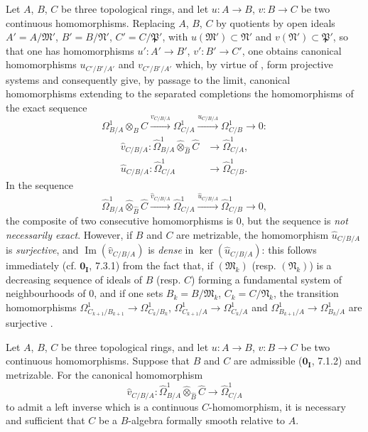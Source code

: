 \begin{env}[20.7.17]
\label{0.20.7.17}
Let $A$, $B$, $C$ be three topological rings, and let $u:A\to B$, $v:B\to C$ be two continuous homomorphisms. Replacing $A$, $B$, $C$ by quotients by open ideals $A'=A/\mathfrak{M}'$, $B'=B/\mathfrak{N}'$, $C'=C/\mathfrak{P}'$, with $u(\mathfrak{M}')\subset\mathfrak{N}'$ and $v(\mathfrak{N}')\subset\mathfrak{P}'$, so that one has homomorphisms $u':A'\to B'$, $v':B'\to C'$, one obtains canonical homomorphisms $u_{C'/B'/A'}$ and $v_{C'/B'/A'}$ which, by virtue of , form projective systems and consequently give, by passage to the limit, canonical homomorphisms extending to the separated completions the homomorphisms of the exact sequence 
\[
  \Omega^1_{B/A}\otimes_B C\xrightarrow{v_{C/B/A}}\Omega^1_{C/A}\xrightarrow{u_{C/B/A}}\Omega^1_{C/B}\longrightarrow 0:
\]
\begin{align}
  \widehat{v}_{C/B/A}:\widehat{\Omega}^1_{B/A}\widehat{\otimes}_{\widehat{B}}\widehat{C}&\longrightarrow\widehat{\Omega}^1_{C/A}, \tag{20.7.17.1}\label{0.20.7.17.1}\\
  \widehat{u}_{C/B/A}:\widehat{\Omega}^1_{C/A}&\longrightarrow\widehat{\Omega}^1_{C/B}. \tag{20.7.17.2}\label{0.20.7.17.2}
\end{align}
In the sequence
\begin{equation}
\tag{20.7.17.3}
\label{0.20.7.17.3}
  \widehat{\Omega}^1_{B/A}\widehat{\otimes}_{\widehat{B}}\widehat{C}
  \xrightarrow{\widehat{v}_{C/B/A}}\widehat{\Omega}^1_{C/A}
  \xrightarrow{\widehat{u}_{C/B/A}}\widehat{\Omega}^1_{C/B}\longrightarrow 0,
\end{equation}
the composite of two consecutive homomorphisms is $0$, but the sequence is \emph{not necessarily exact}. However, if $B$ and $C$ are metrizable, the homomorphism $\widehat{u}_{C/B/A}$ is \emph{surjective}, and $\operatorname{Im}(\widehat{v}_{C/B/A})$ is \emph{dense} in $\ker(\widehat{u}_{C/B/A})$: this follows immediately (cf. $\mathbf{0_I}$, 7.3.1) from the fact that, if $(\mathfrak{M}_k)$ (resp. $(\mathfrak{N}_k)$) is a decreasing sequence of ideals of $B$ (resp. $C$) forming a fundamental system of neighbourhoods of $0$, and if one sets $B_k=B/\mathfrak{M}_k$, $C_k=C/\mathfrak{N}_k$, the transition homomorphisms $\Omega^1_{C_{k+1}/B_{k+1}}\to\Omega^1_{C_k/B_k}$, $\Omega^1_{C_{k+1}/A}\to\Omega^1_{C_k/A}$ and $\Omega^1_{B_{k+1}/A}\to\Omega^1_{B_k/A}$ are surjective .
\end{env}

\begin{proposition}[20.7.18]
\label{0.20.7.18}
Let $A$, $B$, $C$ be three topological rings, and let $u:A\to B$, $v:B\to C$ be two continuous homomorphisms. Suppose that $B$ and $C$ are admissible ($\mathbf{0_I}$, 7.1.2) and metrizable. For the canonical homomorphism
\[
  \widehat{v}_{C/B/A}:\widehat{\Omega}^1_{B/A}\widehat{\otimes}_{\widehat{B}}\widehat{C}\longrightarrow\widehat{\Omega}^1_{C/A}
\]
to admit a left inverse which is a continuous $C$-homomorphism, it is necessary and sufficient that $C$ be a $B$-algebra formally smooth relative to $A$.
\end{proposition}

